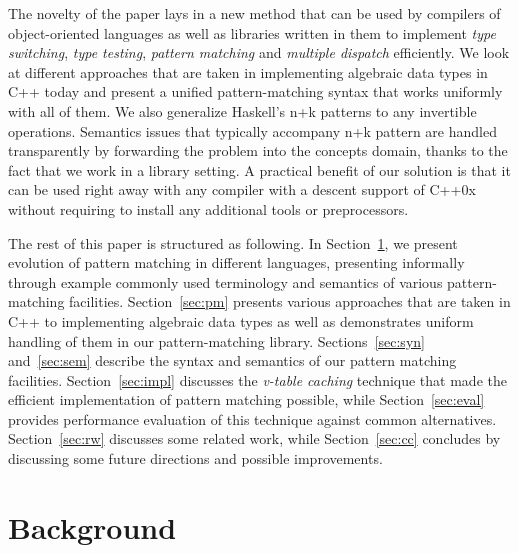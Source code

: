 \documentclass[preprint]{sigplanconf}
\begin{document}
The novelty of the paper lays in a new method that can be used by compilers of 
object-oriented languages as well as libraries written in them to implement 
\emph{type switching}, \emph{type testing}, \emph{pattern matching} and 
\emph{multiple dispatch} efficiently. We look at different approaches that are 
taken in implementing algebraic data types in C++ today and present a unified 
pattern-matching syntax that works uniformly with all of them. We also 
generalize Haskell's n+k patterns to any invertible operations. Semantics issues 
that typically accompany n+k pattern are handled transparently by forwarding the 
problem into the concepts domain, thanks to the fact that we work in a library 
setting. A practical benefit of our solution is that it can be used right away 
with any compiler with a descent support of C++0x without requiring to install 
any additional tools or preprocessors.

The rest of this paper is structured as following. In Section~\ref{sec:bg}, we 
present evolution of pattern matching in different languages, presenting 
informally through example commonly used terminology and semantics of various 
pattern-matching facilities. Section~\ref{sec:pm} presents various approaches 
that are taken in C++ to implementing algebraic data types as well as 
demonstrates uniform handling of them in our pattern-matching library. 
Sections~\ref{sec:syn} and~\ref{sec:sem} describe the syntax and semantics of 
our pattern matching facilities.
Section~\ref{sec:impl} discusses the \emph{v-table caching} technique that made 
the efficient implementation of pattern matching possible, while 
Section~\ref{sec:eval} provides performance evaluation of this technique against 
common alternatives. Section~\ref{sec:rw} discusses some related work, while 
Section~\ref{sec:cc} concludes by discussing some future directions and possible 
improvements.

\section{Background} %
\label{sec:bg}

\end{document}
